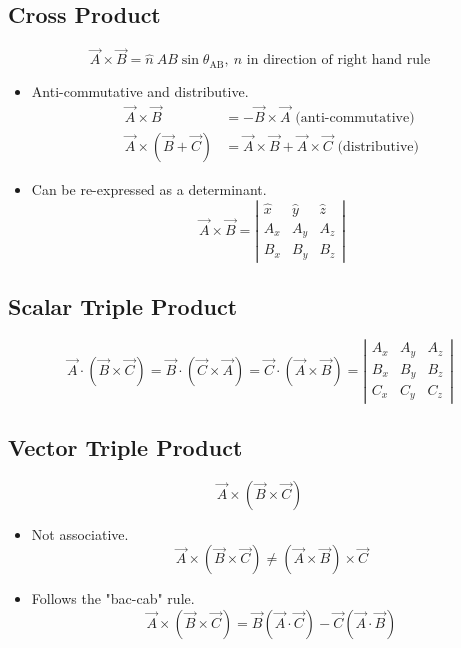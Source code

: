 \documentclass[a4paper]{article}
\begin{document}
\subsection{Cross Product}
$$\overrightarrow{A}\times\overrightarrow{B} = \hat{n}\ AB\sin\theta_\text{AB},\ \hat{n}\text{ in direction of right hand rule}$$
\begin{itemize}
    \item Anti-commutative and distributive.
    \begin{align*}
        \overrightarrow{A}\times\overrightarrow{B} &= -\overrightarrow{B}\times\overrightarrow{A}\text{ (anti-commutative)}\\
        \overrightarrow{A}\times(\overrightarrow{B}+\overrightarrow{C}) &= \overrightarrow{A}\times\overrightarrow{B}+\overrightarrow{A}\times\overrightarrow{C}\text{ (distributive)}
    \end{align*}
    \item Can be re-expressed as a determinant.
    $$\overrightarrow{A}\times\overrightarrow{B} = \left|
    \begin{array}{ccc}
        \hat{x} & \hat{y} & \hat{z}\\
         A_x & A_y & A_z\\
         B_x & B_y & B_z
    \end{array}\right|$$
\end{itemize}

\subsection{Scalar Triple Product}
$$\overrightarrow{A}\cdot(\overrightarrow{B}\times\overrightarrow{C}) = \overrightarrow{B}\cdot(\overrightarrow{C}\times\overrightarrow{A}) = \overrightarrow{C}\cdot(\overrightarrow{A}\times\overrightarrow{B}) = \left|
    \begin{array}{ccc}
         A_x & A_y & A_z\\
         B_x & B_y & B_z\\
         C_x & C_y & C_z
    \end{array}\right|$$

\subsection{Vector Triple Product}
$$\overrightarrow{A}\times(\overrightarrow{B}\times\overrightarrow{C})$$
\begin{itemize}
    \item Not associative.
    $$\overrightarrow{A}\times(\overrightarrow{B}\times\overrightarrow{C})\neq(\overrightarrow{A}\times\overrightarrow{B})\times\overrightarrow{C}$$
    \item Follows the "bac-cab" rule.
    $$\overrightarrow{A}\times(\overrightarrow{B}\times\overrightarrow{C}) = \overrightarrow{B}(\overrightarrow{A}\cdot\overrightarrow{C})-\overrightarrow{C}(\overrightarrow{A}\cdot\overrightarrow{B})$$
\end{itemize}
\end{document}
